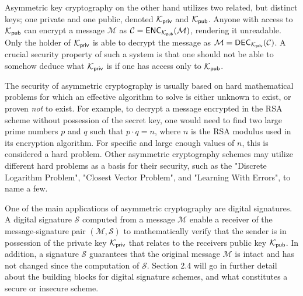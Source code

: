 Asymmetric key cryptography on the other hand utilizes two related, but distinct keys; one private and one public, denoted $\mathcal{K}_{\mathsf{priv}}$ and $\mathcal{K}_{\mathsf{pub}}$.
Anyone with access to $\mathcal{K}_{\mathsf{pub}}$ can encrypt a message $\mathcal{M}$ as $\mathcal{C} = \mathsf{ENC}_{\mathcal{K}_{\mathsf{pub}}}(\mathcal{M})$, rendering it unreadable. Only the holder of $\mathcal{K}_{\mathsf{priv}}$ is able to decrypt the message
as $\mathcal{M} = \mathsf{DEC}_{\mathcal{K}_{\mathsf{priv}}}(\mathcal{C})$. A crucial security property of such a system is that one should not be able to somehow deduce what $\mathcal{K}_{\mathsf{priv}}$ is if one has access only to $\mathcal{K}_{\mathsf{pub}}$.

The security of asymmetric cryptography is usually based on hard mathematical problems for which an effective algorithm to solve is either unknown to exist, or proven \textit{not} to exist. 
For example, to decrypt a message encrypted in the RSA scheme \cite{RSA78} without possession of the secret key, one would need to find two large prime numbers $p$ and $q$ such that 
$p \cdot q = n$, where $n$ is the RSA modulus used in its encryption algorithm. For specific and large enough values of $n$, this is considered a hard problem. \cite{ENCYCLOPEDIA}
Other asymmetric cryptography schemes may utilize different hard problems as a basis for their security, such as the "Discrete Logarithm Problem", "Closest Vector Problem", and "Learning With Errors", to name a few.

One of the main applications of asymmetric cryptography are digital signatures. A digital signature $\mathcal{S}$ computed from a message $\mathcal{M}$ enable a receiver of the 
message-signature pair $(\mathcal{M}, \mathcal{S})$ to mathematically verify that the sender is in possession of the private key $\mathcal{K}_{\mathsf{priv}}$ that relates to the receivers public key $\mathcal{K}_{\mathsf{pub}}$.
In addition, a signature $\mathcal{S}$ guarantees that the original message $\mathcal{M}$ is intact and has not changed since the computation of $\mathcal{S}$.
Section 2.4 will go in further detail about the building blocks for digital signature schemes, and what constitutes a secure or insecure scheme.

